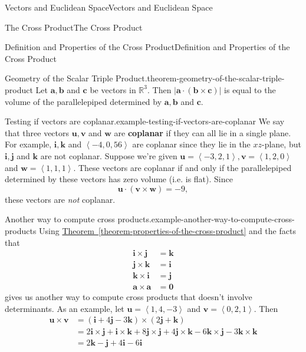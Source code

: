 \documentclass[10pt,]{book}
\newcommand{\terminology}[1]{\textbf{#1}}
\numberwithin{equation}{section}
\newcommand{\RR}{\mathbb{R}}
\newcommand{\vv}[1]{\mathbf{#1}}
\newcommand{\dotprod}[1]{\left\langle #1 \right\rangle}
\begin{document}
\begin{chapterptx}{Vectors and Euclidean Space}{}{Vectors and Euclidean Space}{}{}
\begin{sectionptx}{The Cross Product}{}{The Cross Product}{}{}
\begin{subsectionptx}{Definition and Properties of the Cross Product}{}{Definition and Properties of the Cross Product}{}{}
\begin{theorem}{Geometry of the Scalar Triple Product.}{}{theorem-geometry-of-the-scalar-triple-product}%
\hypertarget{p-969}{}%
Let \(\vv{a},\vv{b}\) and \(\vv{c}\) be vectors in \(\RR^{3}\). Then \(|\vv{a}\cdot(\vv{b}\times\vv{c})|\) is equal to the volume of the parallelepiped determined by \(\vv{a},\vv{b}\) and \(\vv{c}\).%
\end{theorem}
\begin{example}{Testing if vectors are coplanar.}{example-testing-if-vectors-are-coplanar}%
\hypertarget{p-970}{}%
We say that three vectors \(\vv{u},\vv{v}\) and \(\vv{w}\) are \terminology{coplanar} if they can all lie in a single plane. For example, \(\vv{i},\vv{k}\) and \(\dotprod{-4,0,56}\) are coplanar since they lie in the \(xz\)-plane, but \(\vv{i},\vv{j}\) and \(\vv{k}\) are not coplanar. Suppose we're given \(\vv{u} = \dotprod{-3,2,1},\vv{v} = \dotprod{1,2,0}\) and \(\vv{w} = \dotprod{1,1,1}\). These vectors are coplanar if and only if the parallelepiped determined by these vectors has zero volume (i.e. is flat). Since%
%
\begin{equation*}
\vv{u}\cdot(\vv{v}\times\vv{w}) = -9,
\end{equation*}
\hypertarget{p-971}{}%
these vectors are \emph{not} coplanar.%
\end{example}
\begin{example}{Another way to compute cross products.}{example-another-way-to-compute-cross-products}%
\hypertarget{p-972}{}%
Using \hyperref[theorem-properties-of-the-cross-product]{Theorem~\ref{theorem-properties-of-the-cross-product}} and the facts that%
%
\begin{align*}
\vv{i}\times\vv{j} & = \vv{k} \\
\vv{j}\times\vv{k} & = \vv{i} \\
\vv{k}\times\vv{i} & = \vv{j} \\
\vv{a}\times\vv{a} & = \vv{0} 
\end{align*}
\hypertarget{p-973}{}%
gives us another way to compute cross products that doesn't involve determinants. As an example, let \(\vv{u} = \dotprod{1,4,-3}\) and \(\vv{v} = \dotprod{0,2,1}.\) Then%
%
\begin{align*}
\vv{u}\times\vv{v} & = (\vv{i}+4\vv{j}-3\vv{k})\times(2\vv{j}+\vv{k}) \\
& = 2\vv{i}\times\vv{j} + \vv{i}\times\vv{k} +8\vv{j}\times\vv{j} + 4\vv{j}\times\vv{k} - 6\vv{k}\times\vv{j} -3\vv{k}\times\vv{k} \\
& = 2\vv{k}-\vv{j}+4\vv{i}-6\vv{i} \\

\end{align*}
\end{example}
\end{subsectionptx}
\end{sectionptx}
\end{chapterptx}
\end{document}

